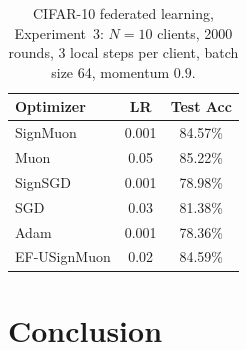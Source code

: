 \documentclass{article}
\begin{document}
\begin{table}[H]
\centering
\caption{CIFAR-10 federated learning, Experiment~3: $N=10$ clients, 2000 rounds, 3 local steps per client, batch size 64, momentum $0.9$.}
\label{tab:exp_3}
\small
\renewcommand{\arraystretch}{1.2}
\begin{tabular}{|l|c|c|}
\hline
\textbf{Optimizer} & \textbf{LR} & \textbf{Test Acc} \\
\hline
SignMuon & 0.001 & 84.57\% \\
Muon & 0.05 & 85.22\% \\
SignSGD & 0.001 & 78.98\% \\
SGD & 0.03 & 81.38\% \\
Adam & 0.001 & 78.36\% \\
EF-USignMuon & 0.02 & 84.59\% \\
\hline
\end{tabular}
\end{table}


\section{Conclusion}\label{sec:conclusion}

\end{document}
